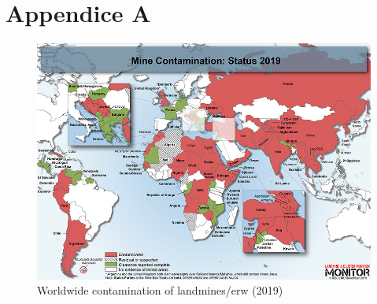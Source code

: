 \appendix

\hypertarget{AppA}{\chapter{Appendice A}}

\begin{figure}[h]
  \centering
  \includegraphics[width=\textwidth]{00 - Images/2019_MBT_Contamination_Final_Full.jpg}
  \caption{Worldwide contamination of landmines/\gls{erw} (2019) \cite{Monitor-Maps:online}}
  \label{fig:contamination_mine_erw}
\end{figure}